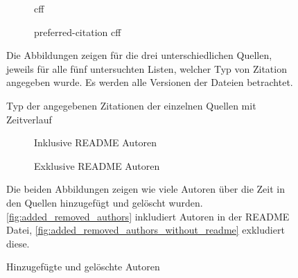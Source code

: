 \begin{figure}
    \begin{subfigure}{.5\textwidth}
        \centering
        
        \caption{\gls{cff}}
        \label{fig:citation_counts_cff}
    \end{subfigure}%
    \begin{subfigure}{.5\textwidth}
        \centering
        
        \caption{\glqq preferred-citation\grqq{} \gls{cff}}
        \label{fig:citation_counts_preferred_citation_cff}
    \end{subfigure}
    \centering
    \begin{subfigure}{.5\textwidth}
        \centering
        
        \caption{}
        \label{fig:citation_counts_bib}
    \end{subfigure}
    \caption{Typ der angegebenen Zitationen der einzelnen Quellen mit Zeitverlauf}
    \small
    Die Abbildungen zeigen für die drei unterschiedlichen Quellen, jeweils für alle fünf untersuchten Listen, welcher Typ von Zitation angegeben wurde. Es werden alle Versionen der Dateien betrachtet.
\end{figure}

\begin{figure}
    \begin{subfigure}{.5\textwidth}
        \centering
        
        \caption{Inklusive README Autoren}
        \label{fig:added_removed_authors}
    \end{subfigure}%
    \begin{subfigure}{.5\textwidth}
        \centering
        
        \caption{Exklusive README Autoren}
        \label{fig:added_removed_authors_without_readme}
    \end{subfigure}
    \caption{Hinzugefügte und gelöschte Autoren}
    \small
    Die beiden Abbildungen zeigen wie viele Autoren über die Zeit in den Quellen hinzugefügt und gelöscht wurden. \autoref{fig:added_removed_authors} inkludiert Autoren in der README Datei, \autoref{fig:added_removed_authors_without_readme} exkludiert diese.
\end{figure}


